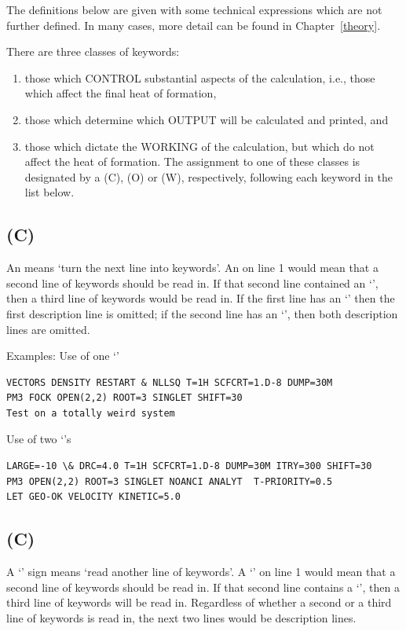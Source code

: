 \label{defkey}
The definitions below are  given  with  some  technical  expressions which are
not further defined. In many cases, more detail can be found in
Chapter~\ref{theory}.

There are three  classes  of  keywords:
\begin{enumerate}
\item those  which  CONTROL substantial  aspects  of  the  calculation,  i.e.,
those which affect the final heat of formation,
\item those which determine which OUTPUT will be calculated and printed, and
\item those which dictate the WORKING of the calculation,  but which do not
affect the heat of formation. The assignment to one of these classes is
designated by a (C), (O) or (W), respectively, following each keyword in the
list below.
\end{enumerate}


\subsection*{\comp{\&} (C)}
\index{\&}\label{keyword-3lines}
An  means `turn the next line into keywords'.  An  on line
1 would mean that a second line of  keywords should be  read  in. If that
second line contained an `\comp{\&}',  then a third line of keywords would be
read in.   If the first line has an `\comp{\&}' then the first description
line  is  omitted; if the second line has an `\comp{\&}', then both description
lines are omitted.

Examples: Use of one `\comp{\&}'

\begin{verbatim}
VECTORS DENSITY RESTART & NLLSQ T=1H SCFCRT=1.D-8 DUMP=30M
PM3 FOCK OPEN(2,2) ROOT=3 SINGLET SHIFT=30
Test on a totally weird system
\end{verbatim}

Use of two `\comp{\&}'s

\begin{verbatim}
LARGE=-10 \& DRC=4.0 T=1H SCFCRT=1.D-8 DUMP=30M ITRY=300 SHIFT=30
PM3 OPEN(2,2) ROOT=3 SINGLET NOANCI ANALYT  T-PRIORITY=0.5
LET GEO-OK VELOCITY KINETIC=5.0
\end{verbatim}


\subsection*{\comp{+} (C)}
A `\comp{+}' sign means `read another line of keywords'.  A `\comp{+}' on line
1 would mean that a second line of keywords should be  read  in.   If that
second line contains a `\comp{+}',  then a third line of keywords will be read
in.  Regardless of whether a second or a third line of keywords is read in, the
next two lines would be description lines.

